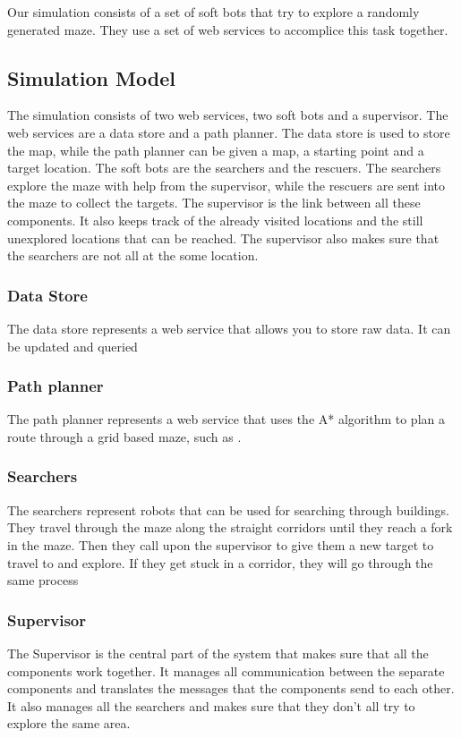 Our simulation consists of a set of soft bots that try to explore a
randomly generated maze. They use a set of web services to accomplice this
task together. 

\subsection{Simulation Model}
The simulation consists of two web services, two soft bots and a supervisor.
The web services are a data store and a path planner. The data store is used
to store the map, while the path planner can be given a map, a starting
point and a target location. The soft bots are the searchers and the
rescuers. The searchers explore the maze with help from the supervisor,
while the rescuers are sent into the maze to collect the targets. The
supervisor is the link between all these components. It also keeps track of
the already visited locations and the still unexplored locations that can
be reached. The supervisor also makes sure that the searchers are not all
at the some location.

\subsubsection{Data Store}
The data store represents a web service that allows you to store raw data.
It can be updated and queried 

\subsubsection{Path planner}
The path planner represents a web service that uses the A* algorithm
\cite{astar} to plan a route through a grid based maze, such as
\cite{astarweb}.

\subsubsection{Searchers}
The searchers represent robots that can be used for searching through
buildings. They travel through the maze along the straight corridors until
they reach a fork in the maze. Then they call upon the supervisor to give
them a new target to travel to and explore. If they get stuck in a
corridor, they will go through the same process

\subsubsection{Supervisor}
The Supervisor is the central part of the system that makes sure that all
the components work together. It manages all communication between the
separate components and translates the messages that the components send to
each other. It also manages all the searchers and makes sure that they
don't all try to explore the same area.

